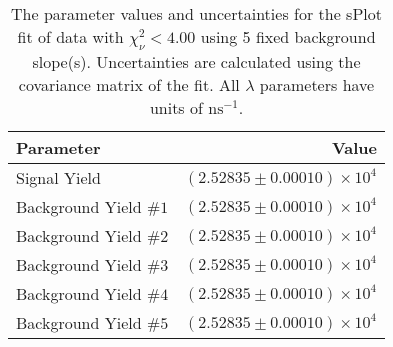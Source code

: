 
\begin{table}
    \begin{center}
        \begin{tabular}{lr}\toprule
            Parameter & Value \\\midrule
            Signal Yield & $(2.52835 \pm 0.00010) \times 10^{4}$ \\
            Background Yield $\#1$ & $(2.52835 \pm 0.00010) \times 10^{4}$ \\
            Background Yield $\#2$ & $(2.52835 \pm 0.00010) \times 10^{4}$ \\
            Background Yield $\#3$ & $(2.52835 \pm 0.00010) \times 10^{4}$ \\
            Background Yield $\#4$ & $(2.52835 \pm 0.00010) \times 10^{4}$ \\
            Background Yield $\#5$ & $(2.52835 \pm 0.00010) \times 10^{4}$ \\\bottomrule
        \end{tabular}
        \caption{The parameter values and uncertainties for the sPlot fit of data with $\chi^2_\nu < 4.00$ using 5 fixed background slope(s). Uncertainties are calculated using the covariance matrix of the fit. All $\lambda$ parameters have units of $\si{\nano\second}^{-1}$.}
    \end{center}
\end{table}
